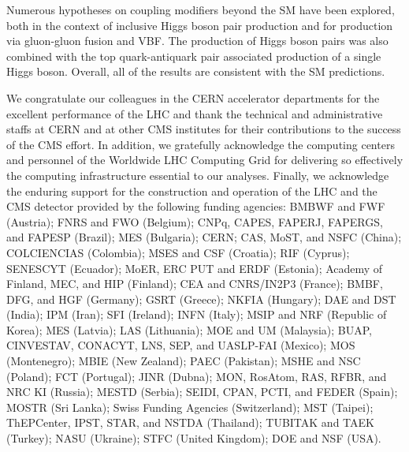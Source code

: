 \documentclass[11pt,twoside,a4paper,cmspaper,final,collab]{cms-tdr}
\begin{document}
Numerous hypotheses on coupling modifiers beyond the 
SM have been explored, both
in the context of inclusive Higgs boson pair production and for \HH
production via gluon-gluon fusion and VBF. 
The production of Higgs boson pairs was also combined with the top
quark-antiquark pair associated production of a single Higgs boson. 
Overall, all of the results are consistent with the SM predictions.


\begin{acknowledgments}
  We congratulate our colleagues in the CERN accelerator departments for the excellent performance of the LHC and thank the technical and administrative staffs at CERN and at other CMS institutes for their contributions to the success of the CMS effort. In addition, we gratefully acknowledge the computing centers and personnel of the Worldwide LHC Computing Grid for delivering so effectively the computing infrastructure essential to our analyses. Finally, we acknowledge the enduring support for the construction and operation of the LHC and the CMS detector provided by the following funding agencies: BMBWF and FWF (Austria); FNRS and FWO (Belgium); CNPq, CAPES, FAPERJ, FAPERGS, and FAPESP (Brazil); MES (Bulgaria); CERN; CAS, MoST, and NSFC (China); COLCIENCIAS (Colombia); MSES and CSF (Croatia); RIF (Cyprus); SENESCYT (Ecuador); MoER, ERC PUT and ERDF (Estonia); Academy of Finland, MEC, and HIP (Finland); CEA and CNRS/IN2P3 (France); BMBF, DFG, and HGF (Germany); GSRT (Greece); NKFIA (Hungary); DAE and DST (India); IPM (Iran); SFI (Ireland); INFN (Italy); MSIP and NRF (Republic of Korea); MES (Latvia); LAS (Lithuania); MOE and UM (Malaysia); BUAP, CINVESTAV, CONACYT, LNS, SEP, and UASLP-FAI (Mexico); MOS (Montenegro); MBIE (New Zealand); PAEC (Pakistan); MSHE and NSC (Poland); FCT (Portugal); JINR (Dubna); MON, RosAtom, RAS, RFBR, and NRC KI (Russia); MESTD (Serbia); SEIDI, CPAN, PCTI, and FEDER (Spain); MOSTR (Sri Lanka); Swiss Funding Agencies (Switzerland); MST (Taipei); ThEPCenter, IPST, STAR, and NSTDA (Thailand); TUBITAK and TAEK (Turkey); NASU (Ukraine); STFC (United Kingdom); DOE and NSF (USA).
  

\end{acknowledgments}
\end{document}
